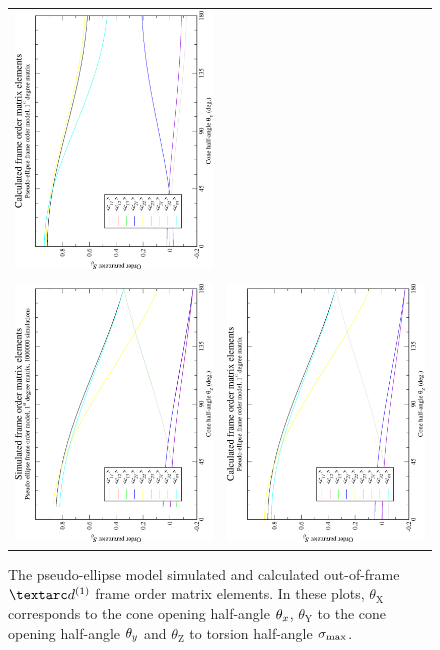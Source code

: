 \begin{figure}
\begin{tabular}{@{}cc@{}}
    \includegraphics[width=.35\textwidth,angle=270]{images/frame_order_matrix/Sij_pseudo-ellipse_out_of_frame_theta_y_calc.eps} \\
    \\[-5pt]
    \includegraphics[width=.35\textwidth,angle=270]{images/frame_order_matrix/Sij_pseudo-ellipse_out_of_frame_theta_z_ens1000000.eps} &
    \includegraphics[width=.35\textwidth,angle=270]{images/frame_order_matrix/Sij_pseudo-ellipse_out_of_frame_theta_z_calc.eps} \\
  \end{tabular}
  \caption[Pseudo-ellipse simulated and calculated out-of-frame $\FOone$ elements.]{
    The pseudo-ellipse model simulated and calculated out-of-frame $\FOone$ frame order matrix elements.
    In these plots, $\theta_\textrm{X}$ corresponds to the cone opening half-angle $\theta_x$, $\theta_\textrm{Y}$ to the cone opening half-angle $\theta_y$ and $\theta_\textrm{Z}$ to torsion half-angle $\sigma_\textrm{max}$.
}
\end{figure}
